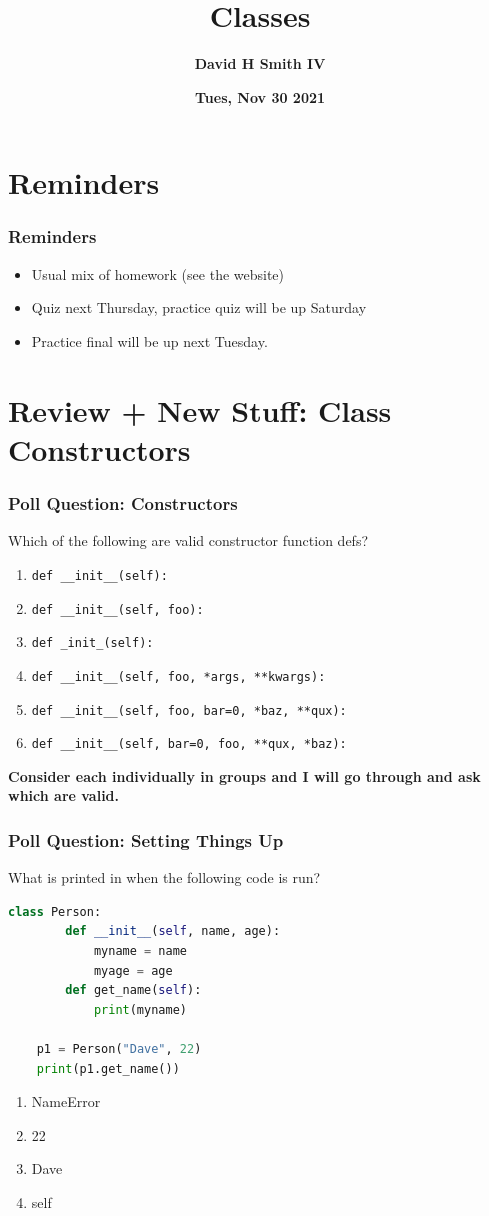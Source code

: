 \documentclass{beamer}
\title{\textbf{Classes}}
\author{\textbf{David H Smith IV}}
\institute[\textbf{UIUC}]{\textbf{University of Illinois Urbana-Champaign}}
\date{\textbf{Tues, Nov 30 2021}}
\begin{document}
\frame{\titlepage}

\section{Reminders}

%
%
\begin{frame}
    \frametitle{Reminders}
    \begin{itemize}
        \item Usual mix of homework (see the website)
        \item Quiz next Thursday, practice quiz will be up Saturday
        \item Practice final will be up next Tuesday.
    \end{itemize}
\end{frame}


\section{Review + New Stuff: Class Constructors}

%
%
\begin{frame}[fragile]
    \frametitle{Poll Question: Constructors}
    Which of the following are valid constructor function defs?
    \begin{enumerate}
        \item \lstinline|def __init__(self):|
        \item \lstinline|def __init__(self, foo):|
        \item \lstinline|def _init_(self):|
        \item \lstinline|def __init__(self, foo, *args, **kwargs):|
        \item \lstinline|def __init__(self, foo, bar=0, *baz, **qux):|
        \item \lstinline|def __init__(self, bar=0, foo, **qux, *baz):|
    \end{enumerate}
    \vfill
    \textbf{Consider each individually in groups and I will go through and ask which are valid.}
\end{frame}

%
%
\begin{frame}[fragile]
    \frametitle{Poll Question: Setting Things Up}
    What is printed in when the following code is run?
    \begin{lstlisting}[language=Python, autogobble]
    class Person:
        def __init__(self, name, age):
            myname = name
            myage = age
        def get_name(self):
            print(myname)

    p1 = Person("Dave", 22)
    print(p1.get_name())
    \end{lstlisting}
    \vfill
    \begin{enumerate}[A]
        \item NameError
        \item 22
        \item Dave
        \item self
    \end{enumerate}
\end{frame}
\end{document}
